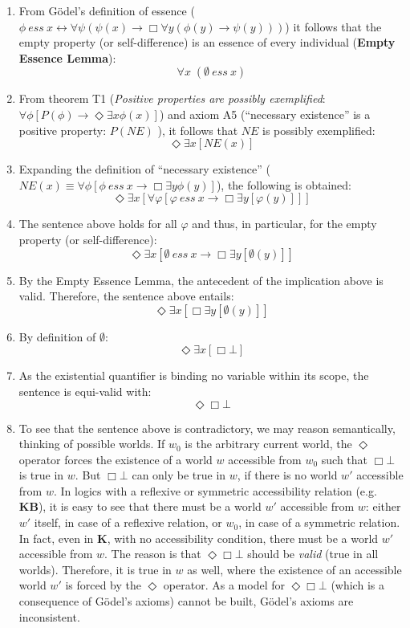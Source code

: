 \documentclass{llncs}
\newcommand{\logic}[1]{\textbf{#1}\xspace}
\newcommand{\KB}{\logic{KB}}
\newcommand{\K}{\logic{K}}
\newcommand{\imp}{{\rightarrow}}
\newcommand{\biimp}{\leftrightarrow}
\newcommand{\allq}{\forall}
\newcommand{\exq}{\exists}
\newcommand{\Dia}{\Diamond} %
\newcommand{\NE}{\mathit{NE}}
\newcommand{\ess}[2]{#1\ \mathit{ess}\ #2}
\newcommand{\nec}{\Box}
\newcommand{\pos}{\Dia}
\begin{document}
\begin{enumerate}
\item From G\"odel's definition of essence 
(${\ess{\phi}{x} \biimp {\allq \psi} (\psi(x)
\imp {\nec} \allq y (\phi(y) \imp \psi(y)))}$) it follows that the
empty property (or self-difference) is an essence of every individual (\textbf{Empty Essence Lemma}): 
$$\allq x\; (\ess{\emptyset}{x})$$

\item From theorem T1 (\textit{Positive properties are possibly
  exemplified}: ${\allq \phi} [P(\phi) \imp {\pos}  \exq x
  \phi(x)]$) and axiom A5 (``necessary existence'' is a positive property: $P(\NE)$ ), it follows that $\NE$ is possibly exemplified:
  $$
  \pos \exq x [\NE(x)]
  $$
 
\item Expanding the definition of ``necessary existence''
  (${\NE(x) \equiv \allq \phi [\ess{\phi}{x} \imp \nec \exq y
    \phi(y)]}$), the following is obtained:
  $$
  \pos \exq x [\allq \varphi [ \ess{\varphi}{x} \imp \nec \exq y [\varphi(y)] ] ]
  $$

\item The sentence above holds for all $\varphi$ and thus, in
  particular, for the empty property (or self-difference):
$$
\pos \exq x [ \ess{\emptyset}{x} \imp \nec \exq y [\emptyset(y)] ]
$$

\item By the Empty Essence Lemma, the antecedent of the implication above is valid. Therefore, the sentence above entails:
$$
\pos \exq x [ \nec \exq y [\emptyset(y)] ]
$$ 

\item By definition of $\emptyset$: 
$$
\pos \exq x [ \nec \bot ]
$$

\item As the existential quantifier is binding no variable within its scope, the sentence is equi-valid with:
$$\pos \nec \bot $$

\item To see that the sentence above is contradictory, we may reason semantically, thinking of possible worlds. If $w_0$ is the arbitrary current world, the $\pos$ operator forces the existence of a world $w$ accessible from $w_0$ such that $\nec \bot$ is true in $w$. But $\nec \bot$ can only be true in $w$, if there is no world $w'$ accessible from $w$. In logics with a reflexive or symmetric accessibility relation (e.g. \KB), it is easy to see that there must be a world $w'$ accessible from $w$: either $w'$ itself, in case of a reflexive relation, or $w_0$, in case of a symmetric relation. In fact, even in \K, with no accessibility condition, there must be a world $w'$ accessible from $w$. The reason is that $\pos \nec \bot$ should be \emph{valid} (true in all worlds). Therefore, it is true in $w$ as well, where the existence of an accessible world $w'$ is forced by the $\pos$ operator. As a model for $\pos \nec \bot$ (which is a consequence of G\"odel's axioms) cannot be built, G\"odel's axioms are inconsistent.
\end{enumerate}
\end{document}
